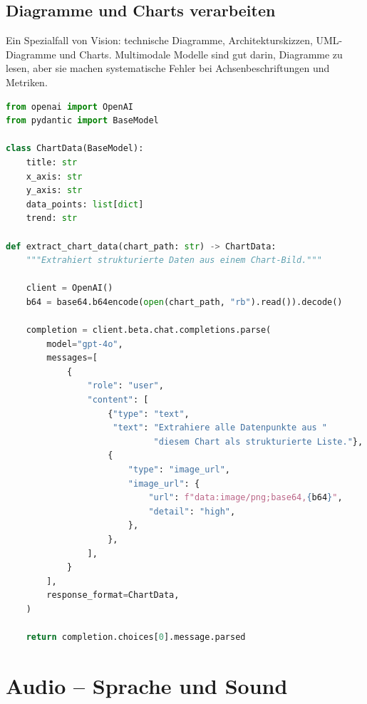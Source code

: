 
\subsection{Diagramme und Charts verarbeiten}

Ein Spezialfall von Vision: technische Diagramme, Architekturskizzen, UML-Diagramme und Charts. Multimodale Modelle sind gut darin, Diagramme zu lesen, aber sie machen systematische Fehler bei Achsenbeschriftungen und Metriken.

\begin{lstlisting}[language=Python, caption=Diagramm-Analyse mit strukturiertem Output]
from openai import OpenAI
from pydantic import BaseModel

class ChartData(BaseModel):
    title: str
    x_axis: str
    y_axis: str
    data_points: list[dict]
    trend: str

def extract_chart_data(chart_path: str) -> ChartData:
    """Extrahiert strukturierte Daten aus einem Chart-Bild."""

    client = OpenAI()
    b64 = base64.b64encode(open(chart_path, "rb").read()).decode()

    completion = client.beta.chat.completions.parse(
        model="gpt-4o",
        messages=[
            {
                "role": "user",
                "content": [
                    {"type": "text",
                     "text": "Extrahiere alle Datenpunkte aus "
                             "diesem Chart als strukturierte Liste."},
                    {
                        "type": "image_url",
                        "image_url": {
                            "url": f"data:image/png;base64,{b64}",
                            "detail": "high",
                        },
                    },
                ],
            }
        ],
        response_format=ChartData,
    )

    return completion.choices[0].message.parsed
\end{lstlisting}

\section{Audio -- Sprache und Sound}

